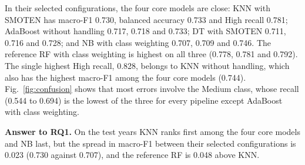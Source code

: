 \documentclass[conference]{IEEEtran}
\begin{document}
In their selected configurations, the four core models are close: KNN with SMOTEN has macro-F1 0.730, balanced accuracy 0.733 and High recall 0.781; AdaBoost without handling 0.717, 0.718 and 0.733; DT with SMOTEN 0.711, 0.716 and 0.728; and NB with class weighting 0.707, 0.709 and 0.746. The reference RF with class weighting is highest on all three (0.778, 0.781 and 0.792). The single highest High recall, 0.828, belongs to KNN without handling, which also has the highest macro-F1 among the four core models (0.744). Fig.~\ref{fig:confusion} shows that most errors involve the Medium class, whose recall (0.544 to 0.694) is the lowest of the three for every pipeline except AdaBoost with class weighting.

\textbf{Answer to RQ1.} On the test years KNN ranks first among the four core models and NB last, but the spread in macro-F1 between their selected configurations is 0.023 (0.730 against 0.707), and the reference RF is 0.048 above KNN.
\end{document}
